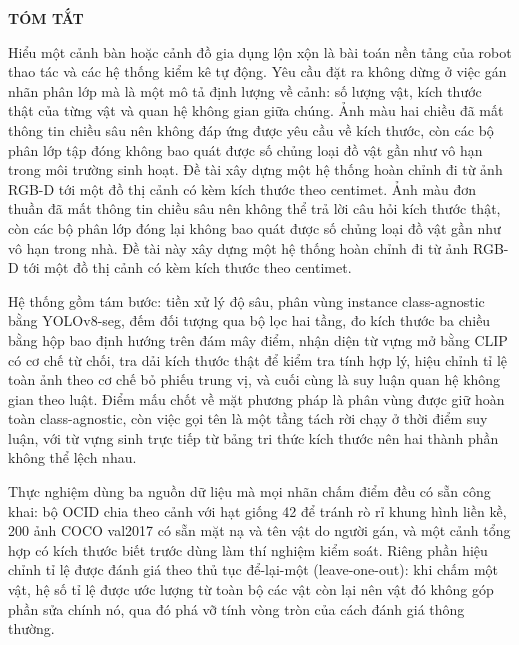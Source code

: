\newpage
\thispagestyle{plain}

\begin{center}
    {\bfseries\Large TÓM TẮT}
\end{center}

\vspace{1cm}

Hiểu một cảnh bàn hoặc cảnh đồ gia dụng lộn xộn là bài toán nền tảng của robot thao tác và các hệ thống kiểm kê tự động. Yêu cầu đặt ra không dừng ở việc gán nhãn phân lớp mà là một mô tả định lượng về cảnh: số lượng vật, kích thước thật của từng vật và quan hệ không gian giữa chúng. Ảnh màu hai chiều đã mất thông tin chiều sâu nên không đáp ứng được yêu cầu về kích thước, còn các bộ phân lớp tập đóng không bao quát được số chủng loại đồ vật gần như vô hạn trong môi trường sinh hoạt. Đề tài xây dựng một hệ thống hoàn chỉnh đi từ ảnh RGB-D tới một đồ thị cảnh có kèm kích thước theo centimet. Ảnh màu đơn thuần đã mất thông tin chiều sâu nên không thể trả lời câu hỏi kích thước thật, còn các bộ phân lớp đóng lại không bao quát được số chủng loại đồ vật gần như vô hạn trong nhà. Đề tài này xây dựng một hệ thống hoàn chỉnh đi từ ảnh RGB-D tới một đồ thị cảnh có kèm kích thước theo centimet.

Hệ thống gồm tám bước: tiền xử lý độ sâu, phân vùng instance class-agnostic bằng YOLOv8-seg, đếm
đối tượng qua bộ lọc hai tầng, đo kích thước ba chiều bằng hộp bao định hướng trên đám mây điểm,
nhận diện từ vựng mở bằng CLIP có cơ chế từ chối, tra dải kích thước thật để kiểm tra tính hợp
lý, hiệu chỉnh tỉ lệ toàn ảnh theo cơ chế bỏ phiếu trung vị, và cuối cùng là suy luận quan hệ
không gian theo luật. Điểm mấu chốt về mặt phương pháp là phân vùng được giữ hoàn toàn
class-agnostic, còn việc gọi tên là một tầng tách rời chạy ở thời điểm suy luận, với từ vựng
sinh trực tiếp từ bảng tri thức kích thước nên hai thành phần không thể lệch nhau.

Thực nghiệm dùng ba nguồn dữ liệu mà mọi nhãn chấm điểm đều có sẵn công khai: bộ OCID chia theo
cảnh với hạt giống 42 để tránh rò rỉ khung hình liền kề, 200 ảnh COCO val2017 có sẵn mặt nạ và
tên vật do người gán, và một cảnh tổng hợp có kích thước biết trước dùng làm thí nghiệm kiểm
soát. Riêng phần hiệu chỉnh tỉ lệ được đánh giá theo thủ tục để-lại-một (leave-one-out): khi
chấm một vật, hệ số tỉ lệ được ước lượng từ toàn bộ các vật còn lại nên vật đó không góp phần
sửa chính nó, qua đó phá vỡ tính vòng tròn của cách đánh giá thông thường.

